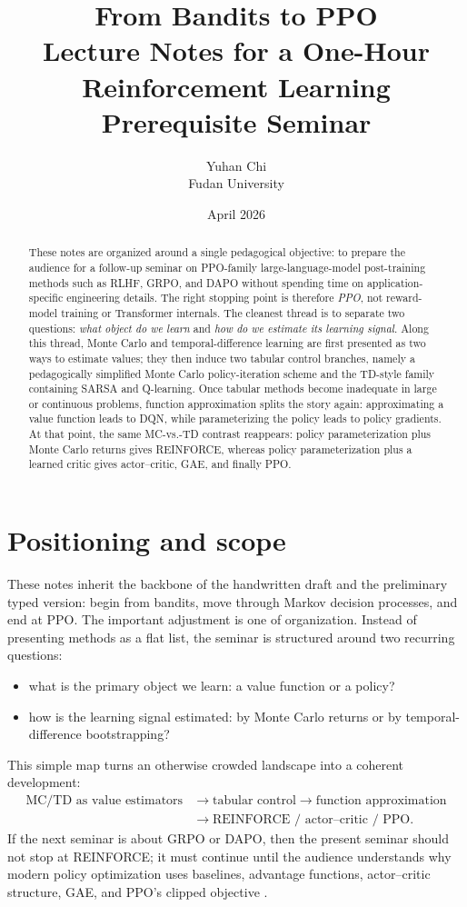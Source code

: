 \documentclass[11pt]{article}
\title{From Bandits to PPO\\[0.35em]\large Lecture Notes for a One-Hour Reinforcement Learning Prerequisite Seminar}
\author{Yuhan Chi\\Fudan University}
\date{April 2026}
\newcommand{\1}{\mathbf{1}}
\begin{document}
\maketitle

\begin{abstract}
These notes are organized around a single pedagogical objective: to prepare the audience for a follow-up seminar on PPO-family large-language-model post-training methods such as RLHF, GRPO, and DAPO without spending time on application-specific engineering details. The right stopping point is therefore \emph{PPO}, not reward-model training or Transformer internals. The cleanest thread is to separate two questions: \emph{what object do we learn} and \emph{how do we estimate its learning signal}. Along this thread, Monte Carlo and temporal-difference learning are first presented as two ways to estimate values; they then induce two tabular control branches, namely a pedagogically simplified Monte Carlo policy-iteration scheme and the TD-style family containing SARSA and Q-learning. Once tabular methods become inadequate in large or continuous problems, function approximation splits the story again: approximating a value function leads to DQN, while parameterizing the policy leads to policy gradients. At that point, the same MC-vs.-TD contrast reappears: policy parameterization plus Monte Carlo returns gives REINFORCE, whereas policy parameterization plus a learned critic gives actor--critic, GAE, and finally PPO.
\end{abstract}

\tableofcontents

\section{Positioning and scope}

These notes inherit the backbone of the handwritten draft and the preliminary typed version: begin from bandits, move through Markov decision processes, and end at PPO. The important adjustment is one of organization. Instead of presenting methods as a flat list, the seminar is structured around two recurring questions:
\begin{itemize}
    \item what is the primary object we learn: a value function or a policy?
    \item how is the learning signal estimated: by Monte Carlo returns or by temporal-difference bootstrapping?
\end{itemize}
This simple map turns an otherwise crowded landscape into a coherent development:
\[
\begin{aligned}
\text{MC/TD as value estimators}
&\rightarrow
\text{tabular control}
\rightarrow
\text{function approximation} \\
&\rightarrow
\text{REINFORCE / actor--critic / PPO}.
\end{aligned}
\]
If the next seminar is about GRPO or DAPO, then the present seminar should not stop at REINFORCE; it must continue until the audience understands why modern policy optimization uses baselines, advantage functions, actor--critic structure, GAE, and PPO's clipped objective \cite{SuttonBarto2018,SchulmanGAE2016,SchulmanPPO2017}.
\end{document}
